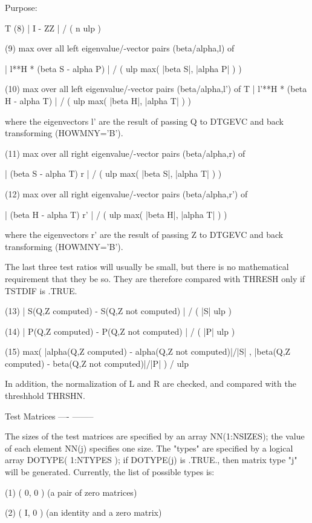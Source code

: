 \begin{DoxyParagraph}{Purpose\+: }
\begin{DoxyVerb}
               T
 (8)   | I - ZZ  | / ( n ulp )

 (9)   max over all left eigenvalue/-vector pairs (beta/alpha,l) of

    | l**H * (beta S - alpha P) | / ( ulp max( |beta S|, |alpha P| ) )

 (10)  max over all left eigenvalue/-vector pairs (beta/alpha,l') of
                           T
   | l'**H * (beta H - alpha T) | / ( ulp max( |beta H|, |alpha T| ) )

       where the eigenvectors l' are the result of passing Q to
       DTGEVC and back transforming (HOWMNY='B').

 (11)  max over all right eigenvalue/-vector pairs (beta/alpha,r) of

       | (beta S - alpha T) r | / ( ulp max( |beta S|, |alpha T| ) )

 (12)  max over all right eigenvalue/-vector pairs (beta/alpha,r') of

       | (beta H - alpha T) r' | / ( ulp max( |beta H|, |alpha T| ) )

       where the eigenvectors r' are the result of passing Z to
       DTGEVC and back transforming (HOWMNY='B').

 The last three test ratios will usually be small, but there is no
 mathematical requirement that they be so.  They are therefore
 compared with THRESH only if TSTDIF is .TRUE.

 (13)  | S(Q,Z computed) - S(Q,Z not computed) | / ( |S| ulp )

 (14)  | P(Q,Z computed) - P(Q,Z not computed) | / ( |P| ulp )

 (15)  max( |alpha(Q,Z computed) - alpha(Q,Z not computed)|/|S| ,
            |beta(Q,Z computed) - beta(Q,Z not computed)|/|P| ) / ulp

 In addition, the normalization of L and R are checked, and compared
 with the threshhold THRSHN.

 Test Matrices
 ---- --------

 The sizes of the test matrices are specified by an array
 NN(1:NSIZES); the value of each element NN(j) specifies one size.
 The "types" are specified by a logical array DOTYPE( 1:NTYPES ); if
 DOTYPE(j) is .TRUE., then matrix type "j" will be generated.
 Currently, the list of possible types is:

 (1)  ( 0, 0 )         (a pair of zero matrices)

 (2)  ( I, 0 )         (an identity and a zero matrix)


\end{DoxyVerb}
\end{DoxyParagraph}
